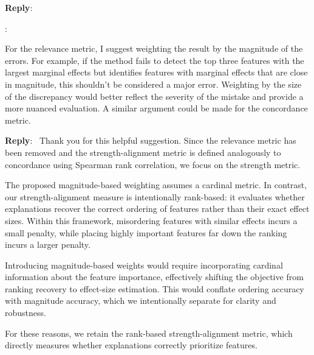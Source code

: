 \documentclass[11pt]{article}
\newcounter{se}[section]
\newcounter{reviewer}
\newcounter{point}[reviewer]
\renewcommand{\thepoint}{R\,\thereviewer.\arabic{point}}
\newenvironment{point}{
    \refstepcounter{point} \bigskip \noindent {\textbf{\thepoint}}: \rmfamily \itshape
}{\medskip}
\newenvironment{reply}
 {\par\medskip \noindent \begin{sf}\textbf{Reply}:\ }
 {\medskip \end{sf}}
\begin{document}
\begin{reply}

\end{reply}

\begin{point}
For the relevance metric, I suggest weighting the result by the magnitude of the errors. For example, if the method fails to detect the top three features with the largest marginal effects but identifies features with marginal effects that are close in magnitude, this shouldn’t be considered a major error. Weighting by the size of the discrepancy would better reflect the severity of the mistake and provide a more nuanced evaluation. A similar argument could be made for the concordance metric.
\end{point}


\begin{reply} Thank you for this helpful suggestion. Since the relevance metric has been removed and the strength-alignment metric is defined analogously to concordance using Spearman rank correlation, we focus on the strength metric.

The proposed magnitude-based weighting assumes a cardinal metric. In contrast, our strength-alignment measure is intentionally rank-based: it evaluates whether explanations recover the correct ordering of features rather than their exact effect sizes. Within this framework, misordering features with similar effects incurs a small penalty, while placing highly important features far down the ranking incurs a larger penalty.

Introducing magnitude-based weights would require incorporating cardinal information about the feature importance, effectively shifting the objective from ranking recovery to effect-size estimation. This would conflate ordering accuracy with magnitude accuracy, which we intentionally separate for clarity and robustness.

For these reasons, we retain the rank-based strength-alignment metric, which directly measures whether explanations correctly prioritize features.

\end{reply}
\end{document}
